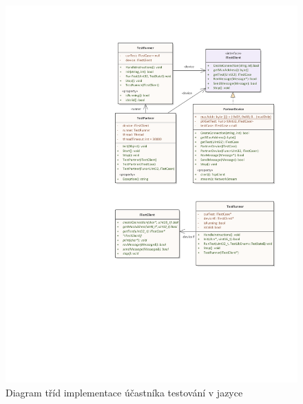 \begin{figure}[H]
    \centering 
    \includegraphics[width=\textwidth]{assets/img/class_diagram/client-cpp.pdf}
    \caption{Diagram tříd implementace účastníka testování v jazyce \protect\cpp{}}
    \label{fig:test_client_cpp}
\end{figure}

